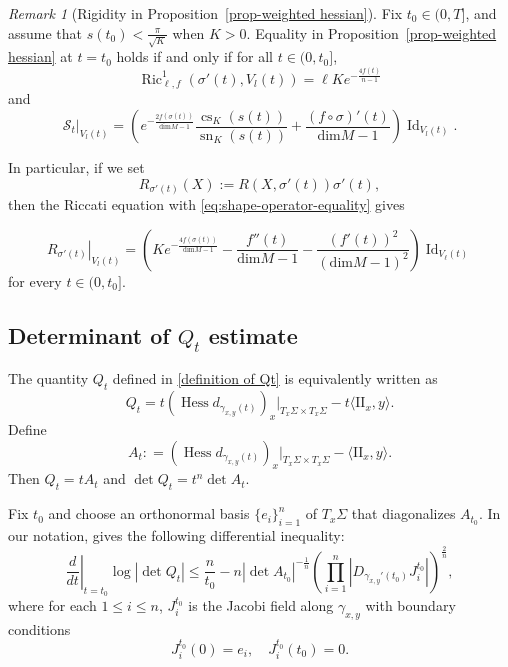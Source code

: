 \documentclass[psamsfonts]{amsart}
\theoremstyle{definition}
\theoremstyle{remark}
\newtheorem{rem}[thm]{Remark}
\numberwithin{equation}{section}
\begin{document}
\begin{rem}[Rigidity in Proposition~\ref{prop-weighted hessian}]\label{rem:prop-1-1}
Fix $t_0 \in (0,T]$, and assume that 
$s(t_0)<\frac{\pi}{\sqrt K}$ when $K >0$.
Equality in Proposition~\ref{prop-weighted hessian} at $t = t_0$ holds if and only if for all $t \in (0,t_0]$,
\begin{equation}\label{eq:weighted-curvature-equality}
    \operatorname{Ric}_{\ell,f}^{1} (\sigma'(t),V_l(t)) = \ell K e^{-\frac{4f(t)}{n-1}}
\end{equation}
and
\begin{equation}\label{eq:shape-operator-equality}
    \mathcal{S}_t|_{V_l(t)} = \left(e^{-\frac{2f(\sigma(t))}{\mathrm{dim}M -1}} \frac{\operatorname{cs}_K(s(t))}{\operatorname{sn}_K(s(t))} + \frac{(f\circ\sigma)'(t)}{\mathrm{dim} M -1}\right) \operatorname{Id}_{V_l(t)}.
\end{equation}

In particular, if we set
$$R_{\sigma'(t)}(X) := R(X,\sigma'(t))\sigma'(t),$$
then the Riccati equation with \eqref{eq:shape-operator-equality} gives

\begin{equation}\label{eq:R-scalar}
    \left.R_{\sigma'(t)}\right|_{V_l(t)} = \left( K e^{-\frac{4f(\sigma(t))}{\mathrm{dim}M -1}} - \frac{f''(t)}{\mathrm{dim} M -1} - \frac{(f'(t))^2}{(\mathrm{dim} M -1)^2} \right) \operatorname{Id}_{V_\ell(t)}
\end{equation}
for every $t \in ( 0, t_0]$.
    
\end{rem}

\subsection{Determinant of $Q_t$ estimate}
The quantity $Q_t$ defined in \eqref{definition of Qt} is equivalently written as 
$$Q_t  = t \left(\operatorname{Hess} d_{\gamma_{  x ,   y}(  t)}\right)_x|_{T_x \Sigma \times T_x \Sigma} - t\langle \mathrm{II}_x, y \rangle .$$
Define
$$A_t : = \left(\operatorname{Hess} d_{\gamma_{  x ,   y}(  t)}\right)_x|_{T_x \Sigma \times T_x \Sigma} - \langle \mathrm{II}_x, y \rangle .$$
Then $Q_t = tA_t$ and $\operatorname{det} Q_t = t^n \operatorname{det} A_t$.

Fix $t_0$ and choose an orthonormal basis $\{e_i\}_{i=1}^n$ of $T_x\Sigma$ that diagonalizes $A_{t_0}$.
In our notation, \cite[Equation (3.24)]{Pan-Yi2026} gives the following differential inequality:
\begin{equation}\label{ineq:log-det-Qt}
    \left.\frac{d}{dt}\right|_{t = t_0} \log |\operatorname{det} Q_t|\leq \frac{n}{t_0} -n |\operatorname{det} A_{t_0}|^{-\frac{1}{n}} \left( \prod_{i=1}^n |D_{\gamma_{x,y}'(t_0)}J_i^{t_0}|\right)^\frac{2}{n},
\end{equation}
where for each $1 \leq i \leq n$, $J_{i}^{t_0}$ is the Jacobi field along $\gamma_{x,y}$ with boundary conditions 
$$J_i^{t_0}(0) = e_i, \quad J_i^{t_0} (t_0) = 0.$$
\end{document}
